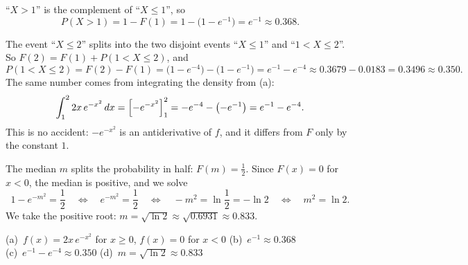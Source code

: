 \begin{solution}
	 ``$X>1$'' is the complement of ``$X\le1$'', so
	\[
		P(X>1)=1-F(1)=1-\bigl(1-e^{-1}\bigr)=e^{-1}\approx 0.368.
	\]

	 The event ``$X\le2$'' splits into the two disjoint events
	``$X\le1$'' and ``$1<X\le2$''. So $F(2)=F(1)+P(1<X\le2)$, and
	\[
		P(1<X\le2)=F(2)-F(1)=\bigl(1-e^{-4}\bigr)-\bigl(1-e^{-1}\bigr)
		=e^{-1}-e^{-4}\approx 0.3679-0.0183=0.3496\approx 0.350.
	\]
	The same number comes from integrating the density from (a):
	\[
		\int_1^2 2x\,e^{-x^2}\,dx=\Bigl[-e^{-x^2}\Bigr]_1^2
		=-e^{-4}-\bigl(-e^{-1}\bigr)=e^{-1}-e^{-4}.
	\]
	This is no accident: $-e^{-x^2}$ is an antiderivative of $f$, and it
	differs from $F$ only by the constant $1$.

	 The median $m$ splits the probability in half: $F(m)=\frac12$.
	Since $F(x)=0$ for $x<0$, the median is positive, and we solve
	\[
		1-e^{-m^2}=\frac12
		\quad\Longleftrightarrow\quad
		e^{-m^2}=\frac12
		\quad\Longleftrightarrow\quad
		-m^2=\ln\frac12=-\ln 2
		\quad\Longleftrightarrow\quad
		m^2=\ln 2.
	\]
	We take the positive root: $m=\sqrt{\ln 2}\approx\sqrt{0.6931}\approx 0.833$.

	\begin{answer}
		(a)~$f(x)=2x\,e^{-x^2}$ for $x\ge0$, $f(x)=0$ for $x<0$ \quad
		(b)~$e^{-1}\approx0.368$ \\
		(c)~$e^{-1}-e^{-4}\approx0.350$ \quad
		(d)~$m=\sqrt{\ln2}\approx0.833$
	\end{answer}
\end{solution}
